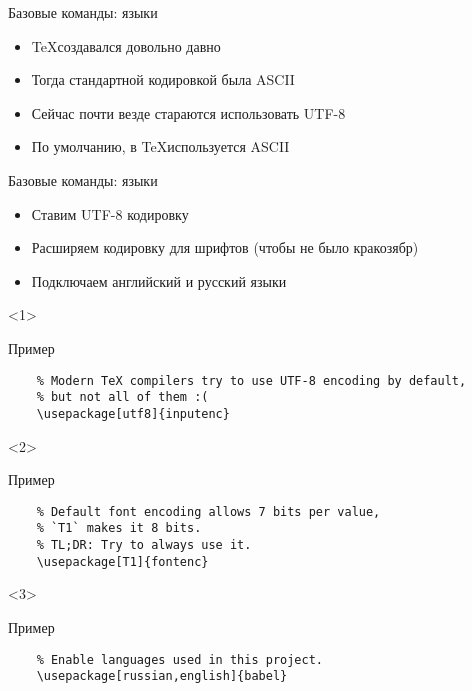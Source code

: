 
\begin{frame}[fragile]{Базовые команды: языки}

\begin{itemize}[<+->]
    \item \TeX \enspace создавался довольно давно
    \item Тогда стандартной кодировкой была ASCII
    \item Сейчас почти везде стараются использовать UTF-8
    \item По умолчанию, в \TeX \enspace используется ASCII
\end{itemize}

\end{frame}


\begin{frame}[fragile]{Базовые команды: языки}

\begin{itemize}[<+->]
    \item Ставим UTF-8 кодировку
    \item Расширяем кодировку для шрифтов (чтобы не было кракозябр)
    \item Подключаем английский и русский языки
\end{itemize}

\begin{onlyenv}<1>
    \begin{block}{Пример}
        \begin{lstlisting}
    % Modern TeX compilers try to use UTF-8 encoding by default,
    % but not all of them :(
    \usepackage[utf8]{inputenc}
        \end{lstlisting}
    \end{block}
\end{onlyenv}

\begin{onlyenv}<2>
    \begin{block}{Пример}
        \begin{lstlisting}
    % Default font encoding allows 7 bits per value, 
    % `T1` makes it 8 bits.
    % TL;DR: Try to always use it.
    \usepackage[T1]{fontenc}
        \end{lstlisting}
    \end{block}
\end{onlyenv}

\begin{onlyenv}<3>
    \begin{block}{Пример}
        \begin{lstlisting}
    % Enable languages used in this project.
    \usepackage[russian,english]{babel}
        \end{lstlisting}
    \end{block}
\end{onlyenv}

\end{frame}
